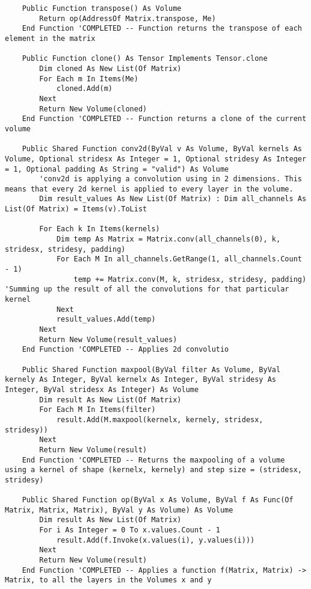 \begin{verbatim}
    Public Function transpose() As Volume
        Return op(AddressOf Matrix.transpose, Me)
    End Function 'COMPLETED -- Function returns the transpose of each element in the matrix
    
    Public Function clone() As Tensor Implements Tensor.clone
        Dim cloned As New List(Of Matrix)
        For Each m In Items(Me)
            cloned.Add(m)
        Next
        Return New Volume(cloned)
    End Function 'COMPLETED -- Function returns a clone of the current volume
    
    Public Shared Function conv2d(ByVal v As Volume, ByVal kernels As Volume, Optional stridesx As Integer = 1, Optional stridesy As Integer = 1, Optional padding As String = "valid") As Volume
        'conv2d is applying a convolution using in 2 dimensions. This means that every 2d kernel is applied to every layer in the volume.
        Dim result_values As New List(Of Matrix) : Dim all_channels As List(Of Matrix) = Items(v).ToList

        For Each k In Items(kernels)
            Dim temp As Matrix = Matrix.conv(all_channels(0), k, stridesx, stridesy, padding)
            For Each M In all_channels.GetRange(1, all_channels.Count - 1)
                temp += Matrix.conv(M, k, stridesx, stridesy, padding) 'Summing up the result of all the convolutions for that particular kernel
            Next
            result_values.Add(temp)
        Next
        Return New Volume(result_values)
    End Function 'COMPLETED -- Applies 2d convolutio
    
    Public Shared Function maxpool(ByVal filter As Volume, ByVal kernely As Integer, ByVal kernelx As Integer, ByVal stridesy As Integer, ByVal stridesx As Integer) As Volume
        Dim result As New List(Of Matrix)
        For Each M In Items(filter)
            result.Add(M.maxpool(kernelx, kernely, stridesx, stridesy))
        Next
        Return New Volume(result)
    End Function 'COMPLETED -- Returns the maxpooling of a volume using a kernel of shape (kernelx, kernely) and step size = (stridesx, stridesy)
    
    Public Shared Function op(ByVal x As Volume, ByVal f As Func(Of Matrix, Matrix, Matrix), ByVal y As Volume) As Volume
        Dim result As New List(Of Matrix)
        For i As Integer = 0 To x.values.Count - 1
            result.Add(f.Invoke(x.values(i), y.values(i)))
        Next
        Return New Volume(result)
    End Function 'COMPLETED -- Applies a function f(Matrix, Matrix) -> Matrix, to all the layers in the Volumes x and y


\end{verbatim}
